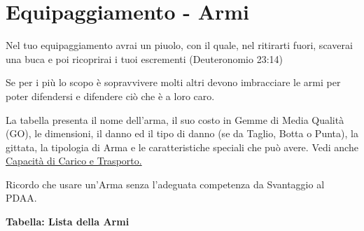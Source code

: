 \documentclass[12pt,a4paper,twoside,openany]{book}
\begin{document}
\section{Equipaggiamento - Armi}\label{equipaggiamentoarmi}
\hypertarget{equipaggiamento.armi}{}

\label{equipaggiamento---armi}
\begin{changemargin}{0.3cm}{0.3cm}\begin{enfasi}{
Nel tuo equipaggiamento avrai un piuolo, con il quale, nel ritirarti fuori, scaverai una buca e poi ricoprirai i tuoi escrementi (Deuteronomio 23:14)
}\end{enfasi}\end{changemargin}

\begin{multicols}{2}
	

Se per i più lo scopo è sopravvivere molti altri devono imbracciare le armi per poter difendersi e difendere ciò che è a loro caro.

La tabella presenta il nome dell'arma, il suo costo in Gemme di Media Qualità (GO), le dimensioni, il danno ed il tipo di danno (se da Taglio, Botta o Punta), la gittata, la tipologia di Arma e le caratteristiche speciali che può avere. Vedi anche \hyperref[sec:capacita-di-carico-e-trasporto-ingombro]{Capacità di Carico e Trasporto.}

Ricordo che usare un'Arma senza l'adeguata competenza da Svantaggio al PDAA.

\end{multicols}

\textbf{Tabella: Lista della Armi}
\end{document}
